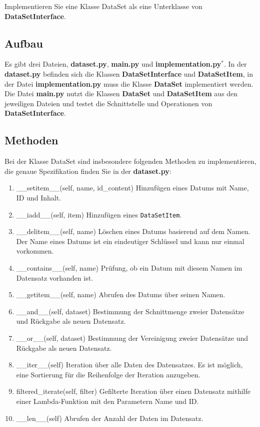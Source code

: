 \documentclass[12pt]{article}
\begin{document}
Implementieren Sie eine Klasse DataSet als eine Unterklasse von \textbf{DataSetInterface}.

\subsection{Aufbau}
Es gibt drei Dateien, \textbf{dataset.py}, \textbf{main.py} und \textbf{implementation.py}$^*$.
In der \textbf{dataset.py} befinden sich die Klassen \textbf{DataSetInterface} und \textbf{DataSetItem},
in der Datei \textbf{implementation.py} muss die Klasse \textbf{DataSet} implementiert werden.
Die Datei \textbf{main.py} nutzt die Klassen \textbf{DataSet} und \textbf{DataSetItem} aus den jeweiligen Dateien und testet die Schnittstelle und Operationen von \textbf{DataSetInterface}.

\subsection{Methoden}
Bei der Klasse DataSet sind insbesondere folgenden Methoden zu implementieren, die genaue Spezifikation finden Sie in der \textbf{dataset.py}:
\begin{enumerate}
    \item{\_\_setitem\_\_(self, name, id\_content)} Hinzufügen eines Datums mit Name, ID und Inhalt.
    \item{\_\_iadd\_\_(self, item)} Hinzufügen eines \texttt{DataSetItem}.
    \item{\_\_delitem\_\_(self, name)} Löschen eines Datums basierend auf dem Namen. Der Name eines Datums ist ein eindeutiger Schlüssel und kann nur einmal vorkommen.
    \item{\_\_contains\_\_(self, name)} Prüfung, ob ein Datum mit diesem Namen im Datensatz vorhanden ist.
    \item{\_\_getitem\_\_(self, name)} Abrufen des Datums über seinen Namen.
    \item{\_\_and\_\_(self, dataset)} Bestimmung der Schnittmenge zweier Datensätze und Rückgabe als neuen Datensatz.
    \item{\_\_or\_\_(self, dataset)} Bestimmung der Vereinigung zweier Datensätze und Rückgabe als neuen Datensatz.
    \item{\_\_iter\_\_(self)} Iteration über alle Daten des Datensatzes. Es ist möglich, eine Sortierung für die Reihenfolge der Iteration anzugeben.
    \item{filtered\_iterate(self, filter)} Gefilterte Iteration über einen Datensatz mithilfe einer Lambda-Funktion mit den Parametern Name und ID.
    \item{\_\_len\_\_(self)} Abrufen der Anzahl der Daten im Datensatz.
\end{enumerate}
\end{document}
